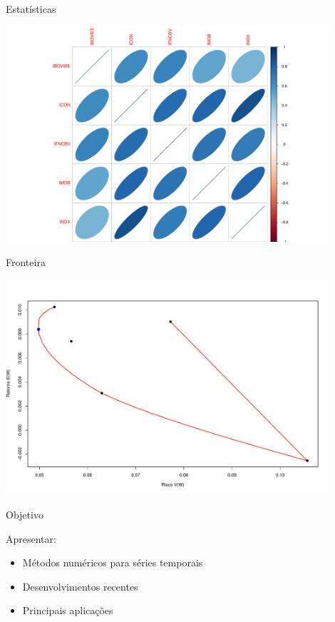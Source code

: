 \documentclass{beamer}
\begin{document}
\begin{frame}{Estatísticas}

\begin{center}
 \includegraphics[height=8cm,keepaspectratio]{descritiva_cor.pdf}
 \end{center}


\end{frame}



\begin{frame}{Fronteira}

\begin{center}
 \includegraphics[height=8cm,keepaspectratio]{fronteira_ativos.pdf}
 \end{center}


\end{frame}


\begin{frame}{Objetivo}

Apresentar:

\begin{itemize}
\item Métodos numéricos para séries temporais 
\item Desenvolvimentos recentes
\item Principais aplicações
\end{itemize}

\end{frame}
\end{document}
